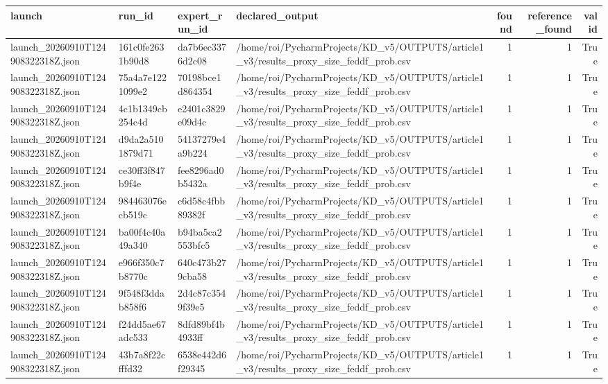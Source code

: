 \begin{tabular}{llllrrr}
\toprule
launch & run\_id & expert\_run\_id & declared\_output & found & reference\_found & valid \\
\midrule
launch\_20260910T124908322318Z.json & 161c0fe2631b90d8 & da7b6ec3376d2c08 & /home/roi/PycharmProjects/KD\_v5/OUTPUTS/article1\_v3/results\_proxy\_size\_feddf\_prob.csv & 1 & 1 & True \\
launch\_20260910T124908322318Z.json & 75a4a7e1221099e2 & 70198bce1d864354 & /home/roi/PycharmProjects/KD\_v5/OUTPUTS/article1\_v3/results\_proxy\_size\_feddf\_prob.csv & 1 & 1 & True \\
launch\_20260910T124908322318Z.json & 4c1b1349cb254c4d & e2401c3829e09d4c & /home/roi/PycharmProjects/KD\_v5/OUTPUTS/article1\_v3/results\_proxy\_size\_feddf\_prob.csv & 1 & 1 & True \\
launch\_20260910T124908322318Z.json & d9da2a5101879d71 & 54137279e4a9b224 & /home/roi/PycharmProjects/KD\_v5/OUTPUTS/article1\_v3/results\_proxy\_size\_feddf\_prob.csv & 1 & 1 & True \\
launch\_20260910T124908322318Z.json & ce30ff3f847b9f4e & fee8296ad0b5432a & /home/roi/PycharmProjects/KD\_v5/OUTPUTS/article1\_v3/results\_proxy\_size\_feddf\_prob.csv & 1 & 1 & True \\
launch\_20260910T124908322318Z.json & 984463076ecb519c & c6d58c4fbb89382f & /home/roi/PycharmProjects/KD\_v5/OUTPUTS/article1\_v3/results\_proxy\_size\_feddf\_prob.csv & 1 & 1 & True \\
launch\_20260910T124908322318Z.json & ba00f4c40a49a340 & b94ba5ca2553bfc5 & /home/roi/PycharmProjects/KD\_v5/OUTPUTS/article1\_v3/results\_proxy\_size\_feddf\_prob.csv & 1 & 1 & True \\
launch\_20260910T124908322318Z.json & e966f350c7b8770c & 640c473b279cba58 & /home/roi/PycharmProjects/KD\_v5/OUTPUTS/article1\_v3/results\_proxy\_size\_feddf\_prob.csv & 1 & 1 & True \\
launch\_20260910T124908322318Z.json & 9f548f3ddab858f6 & 2d4c87c3549f39e5 & /home/roi/PycharmProjects/KD\_v5/OUTPUTS/article1\_v3/results\_proxy\_size\_feddf\_prob.csv & 1 & 1 & True \\
launch\_20260910T124908322318Z.json & f24dd5ae67adc533 & 8dfd89bf4b4933ff & /home/roi/PycharmProjects/KD\_v5/OUTPUTS/article1\_v3/results\_proxy\_size\_feddf\_prob.csv & 1 & 1 & True \\
launch\_20260910T124908322318Z.json & 43b7a8f22cfffd32 & 6538e442d6f29345 & /home/roi/PycharmProjects/KD\_v5/OUTPUTS/article1\_v3/results\_proxy\_size\_feddf\_prob.csv & 1 & 1 & True \\

\end{tabular}
